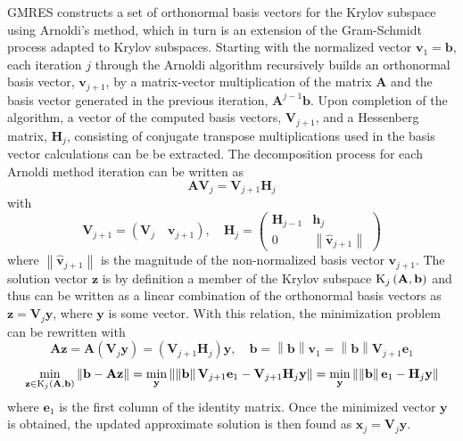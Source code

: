 \documentclass[titlepage,11pt,letterpaper]{article}
\begin{document}
GMRES constructs a set of orthonormal basis vectors for the Krylov subspace using 
Arnoldi's method, which in turn is an extension of the Gram-Schmidt process adapted to 
Krylov subspaces. Starting with the normalized vector $\mathbf v_1=\mathbf b$, each iteration $j$ 
through the Arnoldi algorithm recursively builds an orthonormal basis vector, $\mathbf v_{j+1}$, 
by a matrix-vector multiplication of the matrix $\mathbf A$ and the basis vector 
generated in the previous iteration, $\mathbf A^{j-1}\mathbf b$. Upon completion of the 
algorithm, a vector of the computed basis vectors, $\mathbf V_{j+1}$, and a Hessenberg 
matrix, $\mathbf H_j$, consisting of conjugate transpose multiplications used in the basis 
vector calculations can be be extracted. The decomposition process for each Arnoldi method 
iteration can be written as
%
\begin{equation}\label{eq:arnoldi_decomp}
\mathbf {AV}_j=\mathbf{V}_{j+1} \mathbf{H}_j
\end{equation}
%
with
%
\begin{equation}\label{eq:arnoldi_Vj+1_Hj}
\mathbf {V}_{j+1}=\left(\mathbf V_j \quad \mathbf v_{j+1}\right), \quad
\mathbf {H}_j=\begin{pmatrix}
\mathbf H_{j-1} & \mathbf h_j\\ 
0 & \left \| \hat{\mathbf v}_{j+1} \right \|
\end{pmatrix}
\end{equation}
%
where $\left \| \hat{\mathbf v}_{j+1} \right \|$ is the magnitude of the non-normalized 
basis vector $\mathbf v_{j+1}$. The solution vector $\mathbf z$ is by definition a member of 
the Krylov subspace $\textup{K}_j\left(\mathbf A, \mathbf b\right)$ and thus can be written 
as a linear combination of the orthonormal basis vectors as 
$\mathbf z=\mathbf V_j \mathbf y$, where $\mathbf y$ is some vector. With this relation, the 
minimization problem can be rewritten with
%
\begin{equation}\label{eq:krylov_minimize_elements}
\mathbf {Az}=\mathbf A\left(\mathbf V_j \mathbf y\right)=\left(\mathbf V_{j+1}\mathbf H_j\right)\mathbf y, \quad
\mathbf b=\left\|\mathbf b\right\|\mathbf v_1=\left\|\mathbf b\right\|\mathbf V_{j+1}\mathbf e_1
\end{equation}
%
\begin{equation}\label{eq:krylov_minimize_rewrite}
\min_{\mathbf z\in \textup{K}_j\left(\mathbf A,\mathbf b\right)} \left \| \mathbf {b-Az} \right \|
=\min_{\mathbf y}\left\|\left\|\mathbf b\right\|\mathbf V_{j+1}\mathbf e_1-\mathbf V_{j+1}\mathbf H_j \mathbf y\right\|
=\min_{\mathbf y}\left\|\left\|\mathbf b\right\|\mathbf e_1-\mathbf H_j \mathbf y\right\|
\end{equation}
%
where $\mathbf e_1$ is the first column of the identity matrix. Once the minimized vector $\mathbf y$ 
is obtained, the updated approximate solution is then found as 
$\mathbf x_j=\mathbf V_j \mathbf y$. 
\end{document}
